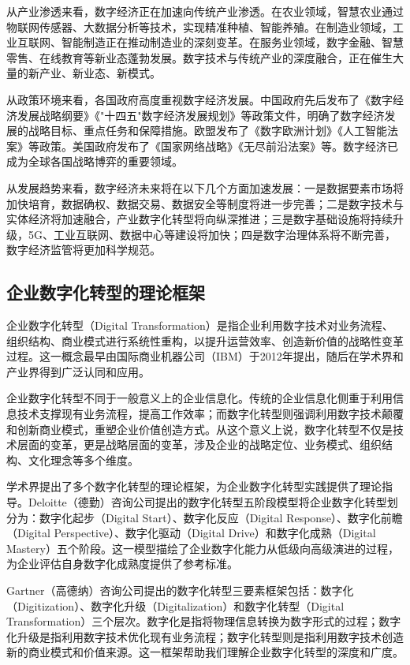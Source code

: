 \documentclass[12pt,a4paper]{article}
\begin{document}
从产业渗透来看，数字经济正在加速向传统产业渗透。在农业领域，智慧农业通过物联网传感器、大数据分析等技术，实现精准种植、智能养殖。在制造业领域，工业互联网、智能制造正在推动制造业的深刻变革。在服务业领域，数字金融、智慧零售、在线教育等新业态蓬勃发展。数字技术与传统产业的深度融合，正在催生大量的新产业、新业态、新模式。

从政策环境来看，各国政府高度重视数字经济发展。中国政府先后发布了《数字经济发展战略纲要》《"十四五"数字经济发展规划》等政策文件，明确了数字经济发展的战略目标、重点任务和保障措施。欧盟发布了《数字欧洲计划》《人工智能法案》等政策。美国政府发布了《国家网络战略》《无尽前沿法案》等。数字经济已成为全球各国战略博弈的重要领域。

从发展趋势来看，数字经济未来将在以下几个方面加速发展：一是数据要素市场将加快培育，数据确权、数据交易、数据安全等制度将进一步完善；二是数字技术与实体经济将加速融合，产业数字化转型将向纵深推进；三是数字基础设施将持续升级，5G、工业互联网、数据中心等建设将加快；四是数字治理体系将不断完善，数字经济监管将更加科学规范。

\subsection{企业数字化转型的理论框架}

企业数字化转型（Digital Transformation）是指企业利用数字技术对业务流程、组织结构、商业模式进行系统性重构，以提升运营效率、创造新价值的战略性变革过程。这一概念最早由国际商业机器公司（IBM）于2012年提出，随后在学术界和产业界得到广泛认同和应用。

企业数字化转型不同于一般意义上的企业信息化。传统的企业信息化侧重于利用信息技术支撑现有业务流程，提高工作效率；而数字化转型则强调利用数字技术颠覆和创新商业模式，重塑企业价值创造方式。从这个意义上说，数字化转型不仅是技术层面的变革，更是战略层面的变革，涉及企业的战略定位、业务模式、组织结构、文化理念等多个维度。

学术界提出了多个数字化转型的理论框架，为企业数字化转型实践提供了理论指导。Deloitte（德勤）咨询公司提出的数字化转型五阶段模型将企业数字化转型划分为：数字化起步（Digital Start）、数字化反应（Digital Response）、数字化前瞻（Digital Perspective）、数字化驱动（Digital Drive）和数字化成熟（Digital Mastery）五个阶段。这一模型描绘了企业数字化能力从低级向高级演进的过程，为企业评估自身数字化成熟度提供了参考标准。

Gartner（高德纳）咨询公司提出的数字化转型三要素框架包括：数字化（Digitization）、数字化升级（Digitalization）和数字化转型（Digital Transformation）三个层次。数字化是指将物理信息转换为数字形式的过程；数字化升级是指利用数字技术优化现有业务流程；数字化转型则是指利用数字技术创造新的商业模式和价值来源。这一框架帮助我们理解企业数字化转型的深度和广度。
\end{document}
